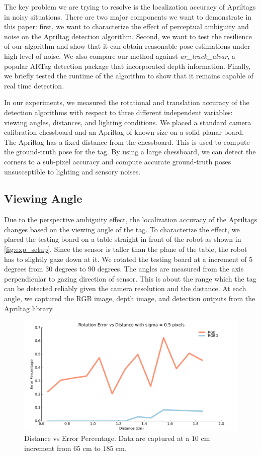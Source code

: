 \label{sec:res}
The key problem we are trying to resolve is the localization accuracy of Apriltags in noisy situations. There are two major components we want to demonstrate in this paper: first, we want to characterize the effect of perceptual ambiguity and noise on the Apriltag detection algorithm. Second, we want to test the resilience of our algorithm and show that it can obtain reasonable pose estimations under high level of noise. We also compare our method against \textit{ar\_track\_alvar}, a popular ARTag detection package that incorporated depth information. Finally, we briefly tested the runtime of the algorithm to show that it remains capable of real time detection. 

In our experiments, we measured the rotational and translation accuracy of the detection algorithms with respect to three different independent variables: viewing angles, distances, and lighting conditions. We placed a standard camera calibration chessboard and an Apriltag of known size on a solid planar board. The Apriltag has a fixed distance from the chessboard. This is used to compute the ground-truth pose for the tag. By using a large chessboard, we can detect the corners to a sub-pixel accuracy and compute accurate ground-truth poses unsusceptible to lighting and sensory noises. 

\subsection{Viewing Angle}

Due to the perspective ambiguity effect, the localization accuracy of the Apriltags changes based on the viewing angle of the tag. To characterize the effect, we placed the testing board on a table straight in front of the robot as shown in \ref{fig:exp_setup}. Since the sensor is taller than the plane of the table, the robot has to slightly gaze down at it. We rotated the testing board at a increment of 5 degrees from 30 degrees to 90 degrees. The angles are measured from the axis perpendicular to gazing direction of sensor. This is about the range which the tag can be detected reliably given the camera resolution and the distance. At each angle, we captured the RGB image, depth image, and detection outputs from the Apriltag library. 

\begin{figure}
\centering
\includegraphics[width=\columnwidth]{figs/distance_fig2}
\caption{Distance vs Error Percentage. Data are captured at a $10$ cm increment from $65$ cm to $185$ cm.}
\label{fig:distance_result}
\end{figure}

